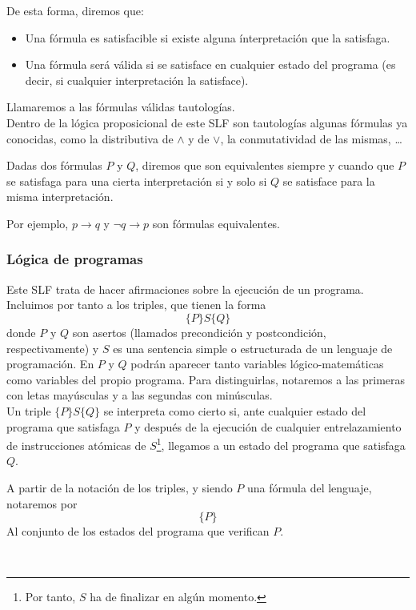 De esta forma, diremos que:
\begin{itemize}
    \item Una fórmula es satisfacible si existe alguna ínterpretación que la satisfaga.
    \item Una fórmula será válida si se satisface en cualquier estado del programa (es decir, si cualquier interpretación la satisface).
\end{itemize}
Llamaremos a las fórmulas válidas tautologías.\\

Dentro de la lógica proposicional de este SLF son tautologías algunas fórmulas ya conocidas, como la distributiva de $\land$ y de $\lor$, la conmutatividad de las mismas, \ldots

\begin{definicion}
    Dadas dos fórmulas $P$ y $Q$, diremos que son equivalentes siempre y cuando que $P$ se satisfaga para una cierta interpretación si y solo si $Q$ se satisface para la misma interpretación.
\end{definicion}
Por ejemplo, $p\rightarrow q$ y $\lnot q\rightarrow p$ son fórmulas equivalentes.

\subsubsection{Lógica de programas}
Este SLF trata de hacer afirmaciones sobre la ejecución de un programa. Incluimos por tanto a los triples, que tienen la forma
\begin{equation*}
    \{P\}S\{Q\}
\end{equation*}
donde $P$ y $Q$ son asertos (llamados precondición y postcondición, respectivamente) y $S$ es una sentencia simple o estructurada de un lenguaje de programación. En $P$ y $Q$ podrán aparecer tanto variables lógico-matemáticas como variables del propio programa. Para distinguirlas, notaremos a las primeras con letas mayúsculas y a las segundas con minúsculas.\\

Un triple $\{P\}S\{Q\}$ se interpreta como cierto si, ante cualquier estado del programa que satisfaga $P$ y después de la ejecución de cualquier entrelazamiento de instrucciones atómicas de $S$\footnote{Por tanto, $S$ ha de finalizar en algún momento.}, llegamos a un estado del programa que satisfaga $Q$.\\

\begin{notacion}
    A partir de la notación de los triples, y siendo $P$ una fórmula del lenguaje, notaremos por
    \begin{equation*}
        \{P\}
    \end{equation*}
    Al conjunto de los estados del programa que verifican $P$.
\end{notacion}~\\

